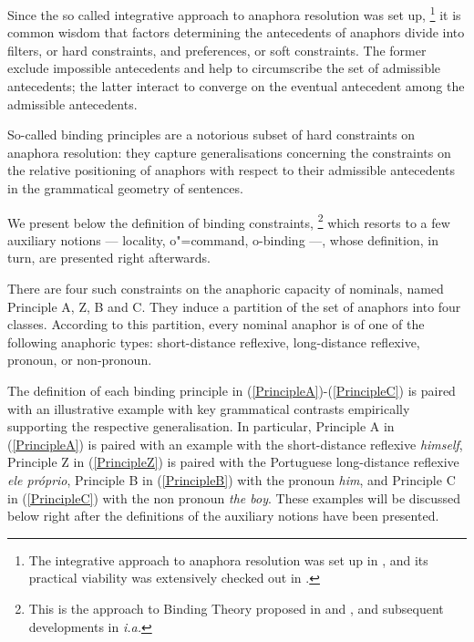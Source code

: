 \documentclass[output=paper
,modfonts
,nonflat]{langsci/langscibook}
\begin{document}
Since the so called integrative approach to anaphora resolution was set up,%
\footnote{The integrative approach to anaphora resolution was set up in
\citep{carb:resol88, richluper:resol88, asher:resol89}, and its practical viability
was extensively checked out in \citep{lappin:pron94, mitkov:resol97}.
}
it is common wisdom that factors determining the antecedents of anaphors divide into 
filters, or hard constraints, and preferences, or soft constraints.  The former exclude
impossible antecedents and help to circumscribe the set of admissible antecedents; 
the latter interact to converge on the eventual antecedent among the admissible antecedents. 

So-called binding principles are a notorious subset of hard constraints on anaphora resolution:  
they capture generalisations concerning the constraints on the relative positioning of anaphors 
with respect to their admissible antecedents in the grammatical geometry of sentences.  


We present below the definition of binding constraints,%
\footnote{
This is the approach
to Binding Theory proposed in \citep{polsag:binding92} and \citep[Chap.6]{polsag:hpsg94}, and subsequent developments in
\citep{xue:ziji94,branco:branch96,brancoMarrafa:subject97, manningSag:1999, wechsler:1999, 
koenig:equa99, branco:ldrefl99, richter:quant99, golde:diss99, branco:livro00, kiss:2001, branco:2002a, branco:2002b, branco:2002c} {\em i.a.}}
which resorts to a few auxiliary 
notions --- locality, o"=command, o-binding ---, whose definition, in turn, are presented right afterwards.


There are four such constraints on the anaphoric capacity of nominals, named Principle A, Z, B and C. 
They induce a partition of the set of anaphors
into four classes. According to this partition, every nominal anaphor is of one of the
following anaphoric types: short-distance reflexive, long-distance reflexive, pronoun,
or non-pronoun.

The definition of each binding principle in (\ref{PrincipleA})-(\ref{PrincipleC}) is paired with an illustrative example with 
key grammatical contrasts
empirically supporting the respective generalisation. In particular, Principle A in (\ref{PrincipleA}) is paired with an example 
with the short-distance reflexive {\em himself},  Principle Z in (\ref{PrincipleZ}) is paired with the Portuguese long-distance reflexive {\em ele pr\'{o}prio}, Principle B in (\ref{PrincipleB}) with the pronoun {\em him}, and Principle C in (\ref{PrincipleC}) with the non pronoun {\em the boy}. These examples will be discussed below right after the definitions of the auxiliary notions have been presented.
\end{document}
